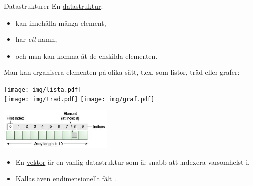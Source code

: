 \documentclass{lecturenotes}
\begin{document}
\begin{Slide}{Datastrukturer}\footnotesize
En \href{https://sv.wikipedia.org/wiki/Datastruktur}{datastruktur}:
\begin{itemize}
\item kan innehålla många element,
\item har \emph{ett} namn,
\item och man kan komma åt de enskilda elementen.
\end{itemize}

Man kan organisera elementen på olika sätt, t.ex. som listor, träd eller grafer:
\begin{multicols*}{2}
\texttt{[image: img/lista.pdf]}\\
\vspace{5mm}
\texttt{[image: img/trad.pdf]}
\hspace{5mm}
\texttt{[image: img/graf.pdf]}

\columnbreak
\pause\includegraphics[width=5.5cm]{img/objects-tenElementArray}
\end{multicols*}
\begin{itemize}
\item En \href{}{vektor}  är en vanlig datastruktur som är snabb att indexera varsomhelst i.  
\item Kallas även endimensionellt \href{https://sv.wikipedia.org/wiki/F\%C3\%A4lt_\%28datastruktur\%29}{fält} .
\end{itemize}
\end{Slide} 
\end{document}
